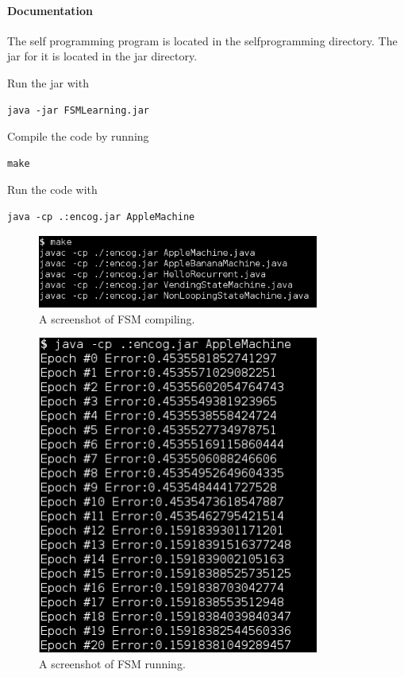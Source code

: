 \documentclass[12pt]{article}
\begin{document}
\paragraph*{Documentation}
The self programming program is located in the selfprogramming directory. The jar for it is located in the jar directory.

Run the jar with
\begin{verbatim}
java -jar FSMLearning.jar
\end{verbatim}
Compile the code by running
\begin{verbatim}
make
\end{verbatim}
Run the code with
\begin{verbatim}
java -cp .:encog.jar AppleMachine 
\end{verbatim}

\begin{figure}
\centering
\includegraphics[width=350]{compileSL.png}
\caption{A screenshot of FSM compiling.}
\end{figure}
\begin{figure}
\centering
\includegraphics[width=350]{runSL.png}
\caption{A screenshot of FSM running.}
\end{figure}
\end{document}
